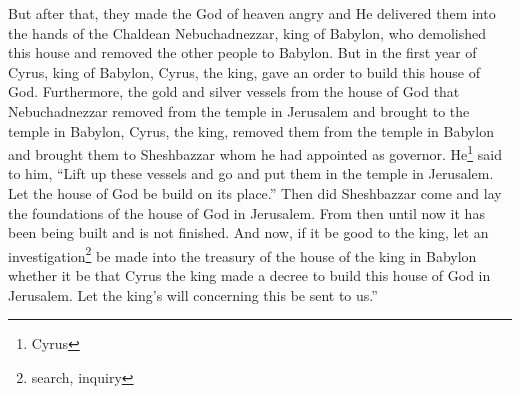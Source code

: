 \begin{enumerate}[align=center]
     But after that, they made the God of heaven angry and He delivered them into the hands of the Chaldean Nebuchadnezzar, king of Babylon, who demolished this house and removed the other people to Babylon.%
     But in the first year of Cyrus, king of Babylon, Cyrus, the king, gave an order to build this house of God.%
     Furthermore, the gold and silver vessels from the house of God that Nebuchadnezzar removed from the temple in Jerusalem and brought to the temple in Babylon, Cyrus, the king, removed them from the temple in Babylon and brought them to Sheshbazzar whom he had appointed as governor.%
     He\footnote{Cyrus} said to him, ``Lift up these vessels and go and put them in the temple in Jerusalem. Let the house of God be build on its place.''%
     Then did Sheshbazzar come and lay the foundations of the house of God in Jerusalem. From then until now it has been being built and is not finished.%
     And now, if it be good to the king, let an investigation\footnote{search, inquiry} be made into the treasury of the house of the king in Babylon whether it be that Cyrus the king made a decree to build this house of God in Jerusalem. Let the king's will concerning this be sent to us.''%
\end{enumerate}
